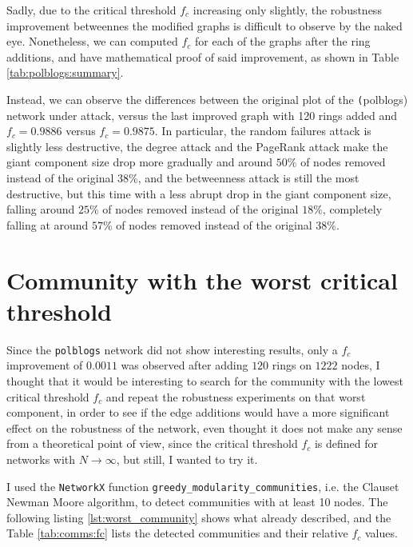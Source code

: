 \documentclass{article}
\begin{document}
Sadly, due to the critical threshold $f_c$ increasing only slightly, the robustness improvement betweennes the modified graphs is difficult to observe by the naked eye.
Nonetheless, we can computed $f_c$ for each of the graphs after the ring additions, and have mathematical proof of said improvement, as shown in Table \ref{tab:polblogs:summary}.

Instead, we can observe the differences between the original plot of the \texttt(polblogs) network under attack, versus the last improved graph with 120 rings added and $f_c=0.9886$ versus $f_c=0.9875$. In particular, the random failures attack is slightly less destructive, the degree attack and the PageRank attack make the giant component size drop more gradually and around $50\%$ of nodes removed instead of the original $38\%$, and the betweenness attack is still the most destructive, but this time with a less abrupt drop in the giant component size, falling around $25\%$ of nodes removed instead of the original $18\%$, completely falling at around $57\%$ of nodes removed instead of the original $38\%$.


\section{Community with the worst critical threshold}\label{sec:worst_community}
Since the \texttt{polblogs} network did not show interesting results, only a $f_c$ improvement of $0.0011$ was observed after adding $120$ rings on $1222$ nodes, I thought that it would be interesting to search for the community with the lowest critical threshold $f_c$ and repeat the robustness experiments on that worst component, in order to see if the edge additions would have a more significant effect on the robustness of the network, even thought it does not make any sense from a theoretical point of view, since the critical threshold $f_c$ is defined for networks with $N\to\infty$, but still, I wanted to try it.

I used the \texttt{NetworkX} function \texttt{greedy\_modularity\_communities}, i.e. the Clauset Newman Moore algorithm, to detect communities with at least 10 nodes. The following listing \ref{lst:worst_community} shows what already described, and the Table \ref{tab:comms:fc} lists the detected communities and their relative $f_c$ values.
\end{document}
